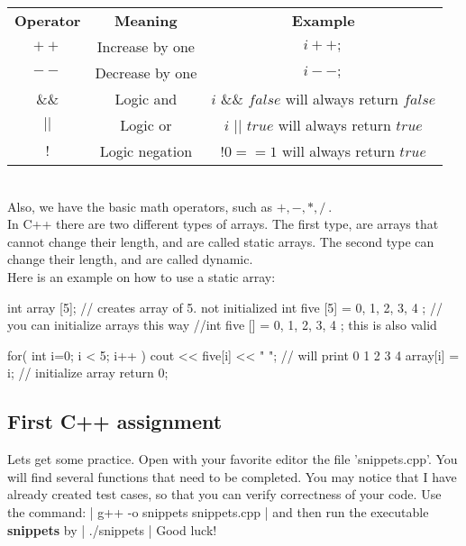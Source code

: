 \documentclass[../notebook.tex]{subfiles}
\begin{document}
\vbuf
\begin{tabular}{c | c | c }
  {\bf Operator} & {\bf Meaning} & {\bf Example} \\ 
  $++$& Increase by one & $i++;$  \\
  $--$& Decrease by one & $i--;$  \\
  $\&\&$ & Logic and & $ i$ \&\& $false  $ will always return $false$ \\
  $||$ & Logic or & $ i$ $||$ $true  $ will always return $true$ \\
  $!$ & Logic negation &  $!0 == 1  $ will always return $true$ \\
\end{tabular}\\
\vbuf
Also, we have the basic math operators, such as $+,-,*,/\ $.\\

In C++ there are two different types of arrays. The first type, are arrays that cannot change their length, and are called static arrays. The second type can change their length, and are called dynamic.\\
Here is an example on how to use a static array:
\begin{cppcode}
  int array [5]; // creates array of 5. not initialized
  int five  [5] = { 0, 1, 2, 3, 4 }; // you can initialize arrays this way
  //int five [] = { 0, 1, 2, 3, 4 }; this is also valid

  for( int i=0; i < 5; i++ )
  {
    cout << five[i] << "  "; // will print 0 1 2 3 4
    array[i] = i; // initialize array
  }
  return 0; 
\end{cppcode}
\subsection{First C++ assignment} %
\label{sub:First C++ assignment}
Lets get some practice. Open with your favorite editor the file 'snippets.cpp'. You will find several functions that need to be completed. You may notice that I have already created test cases, so that you can verify correctness of your code. Use the command:
| g++ -o snippets snippets.cpp |
and then run the executable {\bf snippets} by 
| ./snippets |
Good luck!
\end{document}

